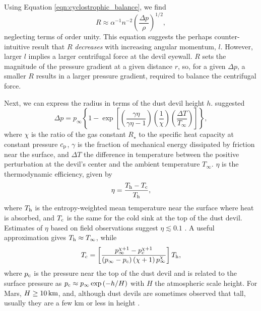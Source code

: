 \documentclass{aastex63}
\begin{document}
Using Equation \ref{eqn:cyclostrophic_balance}, we find
\begin{equation}
    R \approx \alpha^{-1} n^{-2} \left( \dfrac{\Delta p}{\rho} \right)^{1/2},\label{eqn:R_vs_Delta-p}
\end{equation}
neglecting terms of order unity. This equation suggests the perhaps counter-intuitive result that $R$ \emph{decreases} with increasing angular momentum, $l$. However, larger $l$ implies a larger centrifugal force at the devil eyewall. $R$ sets the magnitude of the pressure gradient at a given distance $r$, so, for a given $\Delta p$, a smaller $R$ results in a larger pressure gradient, required to balance the centrifugal force.

Next, we can express the radius in terms of the dust devil height $h$. \citet{1998JAtS...55.3244R} suggested
\begin{equation}
    \Delta p = p_{\infty} \left\{ 1 - \exp \left[ \left( \dfrac{\gamma \eta}{\gamma \eta - 1}\right) \left(\dfrac{1}{\chi}\right) \left( \dfrac{\Delta T}{T_{\infty}}\right) \right] \right\}\label{eqn:Renno_Delta-p},
\end{equation}
where $\chi$ is the ratio of the gas constant $R_\star$ to the specific heat capacity at constant pressure $c_{\rm p}$, $\gamma$ is the fraction of mechanical energy dissipated by friction near the surface, and $\Delta T$ the difference in temperature between the positive perturbation at the devil's center and the ambient temperature $T_\infty$. $\eta$ is the thermodynamic efficiency, given by 
\begin{equation}
    \eta = \dfrac{T_{\rm h} - T_{\rm c}}{T_{\rm h}}\label{eqn:Renno_eta},
\end{equation}{}
where $T_{\rm h}$ is the entropy-weighted mean temperature near the surface where heat is absorbed, and $T_{\rm c}$ is the same for the cold sink at the top of the dust devil. Estimates of $\eta$ based on field observations suggest $\eta \lesssim 0.1$ \citep[e.g.][]{2000JGR...105.1859R}. A useful approximation gives $T_{\rm h} \approx T_\infty$, while
\begin{equation}
    T_{\rm c} = \left[ \dfrac{ p_\infty^{\chi + 1} - p_{c}^{\chi + 1} }{\left( p_\infty - p_{c} \right) \left( \chi + 1\right) p_\infty^{\chi}} \right] T_{\rm h},\label{eqn:Tc}
\end{equation}
where $p_{\rm c}$ is the pressure near the top of the dust devil and is related to the surface pressure as $p_{\rm c} \approx p_\infty \exp\left(-h/H\right)$ with $H$ the atmospheric scale height. For Mars, $H \ge 10\,{\rm km}$, and, although dust devils are sometimes observed that tall, usually they are a few km or less in height \citep{2008Icar..197...39S}. 
\end{document}
